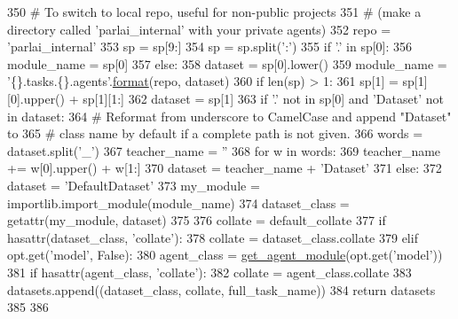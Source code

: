\begin{DoxyCode}
350             \textcolor{comment}{# To switch to local repo, useful for non-public projects}
351             \textcolor{comment}{# (make a directory called 'parlai\_internal' with your private agents)}
352             repo = \textcolor{stringliteral}{'parlai\_internal'}
353             sp = sp[9:]
354         sp = sp.split(\textcolor{stringliteral}{':'})
355         \textcolor{keywordflow}{if} \textcolor{stringliteral}{'.'} \textcolor{keywordflow}{in} sp[0]:
356             module\_name = sp[0]
357         \textcolor{keywordflow}{else}:
358             dataset = sp[0].lower()
359             module\_name = \textcolor{stringliteral}{'\{\}.tasks.\{\}.agents'}.\hyperlink{namespaceparlai_1_1chat__service_1_1services_1_1messenger_1_1shared__utils_a32e2e2022b824fbaf80c747160b52a76}{format}(repo, dataset)
360         \textcolor{keywordflow}{if} len(sp) > 1:
361             sp[1] = sp[1][0].upper() + sp[1][1:]
362             dataset = sp[1]
363             \textcolor{keywordflow}{if} \textcolor{stringliteral}{'.'} \textcolor{keywordflow}{not} \textcolor{keywordflow}{in} sp[0] \textcolor{keywordflow}{and} \textcolor{stringliteral}{'Dataset'} \textcolor{keywordflow}{not} \textcolor{keywordflow}{in} dataset:
364                 \textcolor{comment}{# Reformat from underscore to CamelCase and append "Dataset" to}
365                 \textcolor{comment}{# class name by default if a complete path is not given.}
366                 words = dataset.split(\textcolor{stringliteral}{'\_'})
367                 teacher\_name = \textcolor{stringliteral}{''}
368                 \textcolor{keywordflow}{for} w \textcolor{keywordflow}{in} words:
369                     teacher\_name += w[0].upper() + w[1:]
370                 dataset = teacher\_name + \textcolor{stringliteral}{'Dataset'}
371         \textcolor{keywordflow}{else}:
372             dataset = \textcolor{stringliteral}{'DefaultDataset'}
373         my\_module = importlib.import\_module(module\_name)
374         dataset\_class = getattr(my\_module, dataset)
375 
376         collate = default\_collate
377         \textcolor{keywordflow}{if} hasattr(dataset\_class, \textcolor{stringliteral}{'collate'}):
378             collate = dataset\_class.collate
379         \textcolor{keywordflow}{elif} opt.get(\textcolor{stringliteral}{'model'}, \textcolor{keyword}{False}):
380             agent\_class = \hyperlink{namespaceparlai_1_1core_1_1agents_a14a9d134d76ffd0509e50703d0f2c949}{get\_agent\_module}(opt.get(\textcolor{stringliteral}{'model'}))
381             \textcolor{keywordflow}{if} hasattr(agent\_class, \textcolor{stringliteral}{'collate'}):
382                 collate = agent\_class.collate
383         datasets.append((dataset\_class, collate, full\_task\_name))
384     \textcolor{keywordflow}{return} datasets
385 
386 
\end{DoxyCode}
\mbox{\label{namespaceparlai_1_1core_1_1pytorch__data__teacher_a7b71207eb86027bc93809c1e4d57f641}} 
